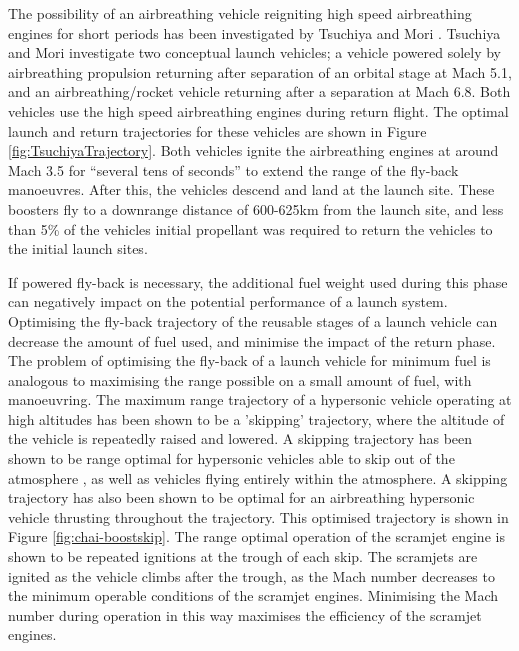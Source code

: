 The possibility of an airbreathing vehicle reigniting high speed airbreathing engines for short periods has been investigated by Tsuchiya and Mori \cite{Tsuchiya2005}.  Tsuchiya and Mori investigate two conceptual launch vehicles; a vehicle powered solely by airbreathing propulsion returning after separation of an orbital stage at Mach 5.1, and an airbreathing/rocket vehicle returning after a separation at Mach 6.8\cite{Tsuchiya2005}.  Both vehicles use the high speed airbreathing engines during return flight. The optimal launch and return trajectories for these vehicles are shown in Figure \ref{fig:TsuchiyaTrajectory}. Both vehicles ignite the airbreathing engines at around Mach 3.5 for “several tens of seconds” to extend the range of the fly-back manoeuvres. After this, the vehicles descend and land at the launch site. 
These boosters fly to a downrange distance of 600-625km from the launch site, and less than 5\% of the vehicles initial propellant was required to return the vehicles to the initial launch sites\cite{Tsuchiya2005}.

If powered fly-back is necessary, the additional fuel weight used during this phase can negatively impact on the potential performance of a launch system. 
Optimising the fly-back trajectory of the reusable stages of a launch vehicle can decrease the amount of fuel used, and minimise the impact of the return phase. 
 The problem of optimising the fly-back of a launch vehicle for minimum fuel is analogous to maximising the range possible on a small amount of fuel, with manoeuvring. The maximum range trajectory of a hypersonic vehicle operating at high altitudes has been shown to be a 'skipping' trajectory, where the altitude of the vehicle is repeatedly raised and lowered\cite{Moshman2014,Darby2011,Toso2015,Chai2015}. A skipping trajectory has been shown to be range optimal for hypersonic vehicles able to skip out of the atmosphere \cite{Moshman2014}, as well as vehicles flying entirely within the atmosphere\cite{Moshman2014,Darby2011,Toso2015,Tetlow1992}. A skipping trajectory has also been shown to be optimal for an airbreathing hypersonic vehicle thrusting throughout the trajectory\cite{Chai2015}. This optimised trajectory is shown in Figure \ref{fig:chai-boostskip}. The range optimal operation of the scramjet engine is shown to be repeated ignitions at the trough of each skip\cite{Chai2015}. The scramjets are ignited as the vehicle climbs after the trough, as the Mach number decreases to the minimum operable conditions of the scramjet engines\cite{Chai2015}. Minimising the Mach number during operation in this way maximises the efficiency of the scramjet engines\cite{Chai2015}.
 
